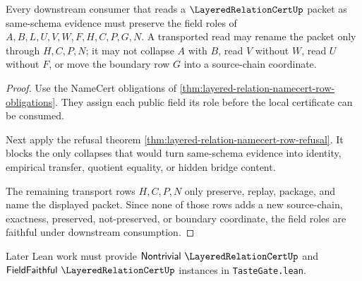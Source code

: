 \begin{theorem}
\label{thm:layered-relation-namecert-row-field-faithful}
Every downstream consumer that reads a $\LayeredRelationCertUp$ packet as same-schema evidence must preserve the field roles of $A,B,L,U,V,W,F,H,C,P,G,N$. A transported read may rename the packet only through $H,C,P,N$; it may not collapse $A$ with $B$, read $V$ without $W$, read $U$ without $F$, or move the boundary row $G$ into a source-chain coordinate.
\end{theorem}
\begin{proof}
Use the NameCert obligations of \autoref{thm:layered-relation-namecert-row-obligations}. They assign each public field its role before the local certificate can be consumed.

Next apply the refusal theorem \autoref{thm:layered-relation-namecert-row-refusal}. It blocks the only collapses that would turn same-schema evidence into identity, empirical transfer, quotient equality, or hidden bridge content.

The remaining transport rows $H,C,P,N$ only preserve, replay, package, and name the displayed packet. Since none of those rows adds a new source-chain, exactness, preserved, not-preserved, or boundary coordinate, the field roles are faithful under downstream consumption.
\end{proof}



Later Lean work must provide $\mathsf{Nontrivial}\ \LayeredRelationCertUp$ and $\mathsf{FieldFaithful}\ \LayeredRelationCertUp$ instances in \texttt{TasteGate.lean}.
